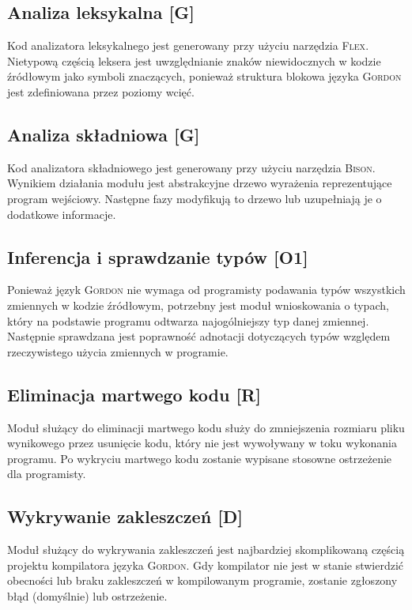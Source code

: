 \documentclass{documentation}
\begin{document}
\subsection{Analiza leksykalna [G]}
\noindent Kod analizatora leksykalnego jest generowany przy użyciu narzędzia \textsc{Flex}. Nietypową
częścią leksera jest uwzględnianie znaków niewidocznych w kodzie źródłowym jako
symboli znaczących, ponieważ struktura blokowa języka \textsc{Gordon} jest
zdefiniowana przez poziomy wcięć.  

\subsection{Analiza składniowa [G]}
\noindent Kod analizatora składniowego jest generowany przy użyciu narzędzia
\textsc{Bison}.  Wynikiem działania modułu jest abstrakcyjne drzewo wyrażenia
reprezentujące program wejściowy.  Następne fazy modyfikują to drzewo lub
uzupełniają je o dodatkowe informacje.

\subsection{Inferencja i sprawdzanie typów [O1]}
\noindent Ponieważ język \textsc{Gordon} nie wymaga od programisty podawania
typów wszystkich zmiennych w kodzie źródłowym, potrzebny jest moduł
wnioskowania o typach, który na podstawie programu odtwarza najogólniejszy typ
danej zmiennej. Następnie sprawdzana jest poprawność adnotacji dotyczących
typów względem rzeczywistego użycia zmiennych w programie.

\subsection{Eliminacja martwego kodu [R]}
\noindent Moduł służący do eliminacji martwego kodu służy do zmniejszenia rozmiaru pliku wynikowego
przez usunięcie kodu, który nie jest wywoływany w toku wykonania programu.
Po wykryciu martwego kodu zostanie wypisane stosowne ostrzeżenie dla programisty.

\subsection{Wykrywanie zakleszczeń [D]} \noindent Moduł służący do wykrywania
zakleszczeń jest najbardziej skomplikowaną częścią projektu kompilatora języka
\textsc{Gordon}. Gdy kompilator nie jest w stanie stwierdzić
obecności lub braku zakleszczeń w kompilowanym programie, zostanie zgłoszony
błąd (domyślnie) lub ostrzeżenie.
\end{document}
